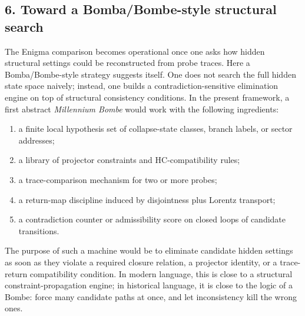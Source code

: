 \subsection*{6. Toward a Bomba/Bombe-style structural search}
The Enigma comparison becomes operational once one asks how hidden structural settings could be reconstructed from probe traces. Here a Bomba/Bombe-style strategy suggests itself. One does not search the full hidden state space naively; instead, one builds a contradiction-sensitive elimination engine on top of structural consistency conditions. In the present framework, a first abstract \emph{Millennium Bombe} would work with the following ingredients:
\begin{enumerate}[leftmargin=2em,label=(\alph*)]
  \item a finite local hypothesis set of collapse-state classes, branch labels, or sector addresses;
  \item a library of projector constraints and HC-compatibility rules;
  \item a trace-comparison mechanism for two or more probes;
  \item a return-map discipline induced by disjointness plus Lorentz transport;
  \item a contradiction counter or admissibility score on closed loops of candidate transitions.
\end{enumerate}
The purpose of such a machine would be to eliminate candidate hidden settings as soon as they violate a required closure relation, a projector identity, or a trace-return compatibility condition. In modern language, this is close to a structural constraint-propagation engine; in historical language, it is close to the logic of a Bombe: force many candidate paths at once, and let inconsistency kill the wrong ones.

